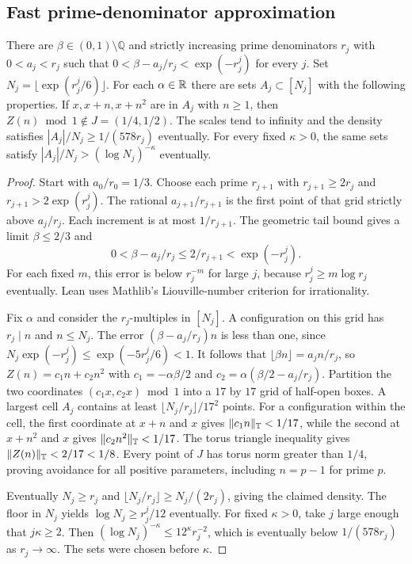 \subsection{Fast prime-denominator approximation}

\begin{proposition}\label{checked-intro-fast-obstruction}
\leanok
There are $\beta\in(0,1)\setminus\mathbb Q$ and strictly increasing
prime denominators $r_j$ with $0<a_j<r_j$ such that
$0<\beta-a_j/r_j<\exp(-r_j^j)$ for every $j$. Set
$N_j=\lfloor\exp(r_j^j/6)\rfloor$. For each $\alpha\in\mathbb R$ there are
sets $A_j\subset[N_j]$ with the following properties.
If $x,x+n,x+n^2$ are in $A_j$ with $n\ge1$, then
$Z(n)\bmod 1\notin J=(1/4,1/2)$. The scales tend to infinity and
the density satisfies $|A_j|/N_j\ge 1/(578r_j)$ eventually.
For every fixed $\kappa>0$, the same sets satisfy
$|A_j|/N_j>(\log N_j)^{-\kappa}$ eventually.
\end{proposition}

\begin{proof}
\leanok
Start with $a_0/r_0=1/3$. Choose each prime $r_{j+1}$ with
$r_{j+1}\ge2r_j$ and $r_{j+1}>2\exp(r_j^j)$.
The rational $a_{j+1}/r_{j+1}$ is the first point of that grid
strictly above $a_j/r_j$. Each increment is at most $1/r_{j+1}$.
The geometric tail bound gives a limit $\beta\le2/3$ and
\[
 0<\beta-a_j/r_j\le 2/r_{j+1}<\exp(-r_j^j).
\]
For each fixed $m$, this error is below $r_j^{-m}$ for large $j$,
because $r_j^j\ge m\log r_j$ eventually. Lean uses Mathlib's
Liouville-number criterion for irrationality.

Fix $\alpha$ and consider the $r_j$-multiples in $[N_j]$. A
configuration on this grid has $r_j\mid n$ and $n\le N_j$.
The error $(\beta-a_j/r_j)n$ is less than one, since
$N_j\exp(-r_j^j)\le \exp(-5r_j^j/6)<1$.
It follows that $\lfloor\beta n\rfloor=a_jn/r_j$, so
$Z(n)=c_1n+c_2n^2$ with $c_1=-\alpha\beta/2$ and
$c_2=\alpha(\beta/2-a_j/r_j)$.
Partition the two coordinates $(c_1x,c_2x)\bmod 1$ into a
$17$ by $17$ grid of half-open boxes. A largest cell $A_j$
contains at least $\lfloor N_j/r_j\rfloor/17^2$ points.
For a configuration within the cell, the first coordinate at
$x+n$ and $x$ gives $\lVert c_1n\rVert_{\mathbb T}<1/17$, while the second at
$x+n^2$ and $x$ gives $\lVert c_2n^2\rVert_{\mathbb T}<1/17$.
The torus triangle inequality gives $\lVert Z(n)\rVert_{\mathbb T}<2/17<1/8$.
Every point of $J$ has torus norm greater than $1/4$, proving
avoidance for all positive parameters, including $n=p-1$ for prime $p$.

Eventually $N_j\ge r_j$ and
$\lfloor N_j/r_j\rfloor\ge N_j/(2r_j)$, giving the
claimed density. The floor in $N_j$ yields
$\log N_j\ge r_j^j/12$ eventually.
For fixed $\kappa>0$, take $j$ large enough that $j\kappa\ge2$.
Then $(\log N_j)^{-\kappa}\le12^\kappa r_j^{-2}$,
which is eventually below $1/(578r_j)$ as $r_j\to\infty$.
The sets were chosen before $\kappa$.
\end{proof}

